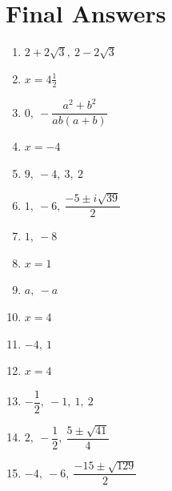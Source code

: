 \documentclass[12pt,a4paper]{article}
\begin{document}
	\vspace{0.6cm}
	\section*{Final Answers}
	
	\begin{enumerate}[label=\textbf{Example \arabic*.}, leftmargin=2.5em]
		\item \(2 + 2\sqrt{3},\ 2 - 2\sqrt{3}\)
		
		\item \(x = 4\frac{1}{2}\)
		
		\item \(0,\ -\dfrac{a^2 + b^2}{ab(a + b)}\)
		
		\item \(x = -4\)
		
		\item \(9,\ -4,\ 3,\ 2\)
		
		\item \(1,\ -6,\ \dfrac{-5 \pm i\sqrt{39}}{2}\)
		
		\item \(1,\ -8\)
		
		\item \(x = 1\)
		
		\item \(a,\ -a\)
		
		\item \(x = 4\)
		
		\item \(-4,\ 1\)
		
		\item \(x = 4\)
		
		\item \(-\dfrac{1}{2},\ -1,\ 1,\ 2\)
		
		\item \(2,\ -\dfrac{1}{2},\ \dfrac{5 \pm \sqrt{41}}{4}\)
		
		\item \(-4,\ -6,\ \dfrac{-15 \pm \sqrt{129}}{2}\)
	\end{enumerate}
	
\end{document}
